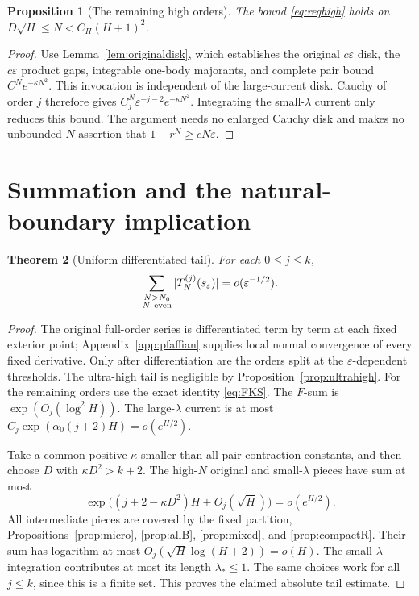 \documentclass[11pt]{article}
\numberwithin{equation}{section}
\newtheorem{theorem}{Theorem}[section]
\newtheorem{proposition}[theorem]{Proposition}
\theoremstyle{definition}
\newcommand{\eps}{\varepsilon}
\newcommand{\se}{s_\varepsilon}
\begin{document}
\begin{proposition}[The remaining high orders]\label{prop:highKS}
The bound \eqref{eq:reqhigh} holds on
\(D\sqrt H\le N<C_H(H+1)^2\).
\end{proposition}
\begin{proof}
Use Lemma~\ref{lem:originaldisk}, which establishes the original
\(c\eps\) disk, the \(c\eps\) product gaps, integrable one-body
majorants, and complete pair bound \(C^Ne^{-\kappa N^2}\).
This invocation is independent of the large-current disk.
Cauchy of order \(j\) therefore gives
\(C_j^N\eps^{-j-2}e^{-\kappa N^2}\).
Integrating the small-\(\lambda\) current only reduces this bound.
The argument needs no enlarged Cauchy disk and makes no
unbounded-\(N\) assertion that \(1-r^N\ge cN\eps\).
\end{proof}



\section{Summation and the natural-boundary implication}
\label{sec:conclusion}
\begin{theorem}[Uniform differentiated tail]\label{thm:tail}
For each \(0\le j\le k\),
\[
 \sum_{\substack{N>N_0\\N\ {\rm even}}}|T_N^{(j)}(\se)|
                =o(\eps^{-1/2}).
\]
\end{theorem}
\begin{proof}
The original full-order series is differentiated term by term at each
fixed exterior point; Appendix~\ref{app:pfaffian} supplies local normal
convergence of every fixed derivative. Only after differentiation are
the orders split at the \(\eps\)-dependent thresholds.
The ultra-high tail is negligible by Proposition~\ref{prop:ultrahigh}.
For the remaining orders use the exact identity \eqref{eq:FKS}.
The \(F\)-sum is \(\exp(O_j(\log^2H))\).
The large-\(\lambda\) current is at most
\(C_j\exp(\alpha_0(j+2)H)=o(e^{H/2})\).

Take a common positive \(\kappa\) smaller than all pair-contraction
constants, and then choose \(D\) with \(\kappa D^2>k+2\).
The high-\(N\) original and small-\(\lambda\) pieces have sum at most
\[
 \exp\bigl((j+2-\kappa D^2)H+O_j(\sqrt H)\bigr)=o(e^{H/2}).
\]
All intermediate pieces are covered by the fixed partition,
Propositions~\ref{prop:micro}, \ref{prop:allB}, \ref{prop:mixed},
and \ref{prop:compactR}. Their sum has logarithm at most
\(O_j(\sqrt H\log(H+2))=o(H)\).
The small-\(\lambda\) integration contributes at most its length
\(\lambda_*\le1\). The same choices work for all \(j\le k\), since
this is a finite set. This proves the claimed absolute tail estimate.
\end{proof}
\end{document}

